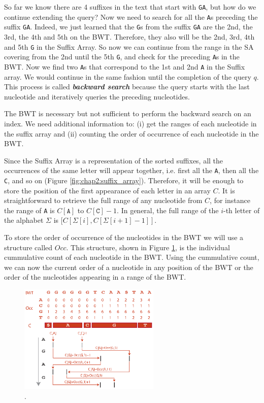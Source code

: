 So far we know there are 4 suffixes in the text that start with
\texttt{GA}, but how do we continue extending the query? Now we need
to search for all the \texttt{A}s preceding the suffix
\texttt{GA}. Indeed, we just learned that the \texttt{G}s from the
suffix \texttt{GA} are the 2nd, the 3rd, the 4th and 5th on the
BWT. Therefore, they also will be the 2nd, 3rd, 4th and 5th \texttt{G}
in the Suffix Array. So now we can continue from the range in the SA
covering from the 2nd until the 5th \texttt{G}, and check for the
preceding \texttt{A}s in the BWT. Now we find two \texttt{A}s that
correspond to the 1st and 2nd \texttt{A} in the Suffix array. We would
continue in the same fashion until the completion of the query
$q$. This process is called {\em\bf backward search} because the query
starts with the last nucleotide and iteratively queries the preceding
nucleotides.

The BWT is necessary but not sufficient to perform the backward search
on an index. We need additional information to: (i) get the ranges of
each nucleotide in the suffix array and (ii) counting the order of
occurrence of each nucleotide in the BWT.

Since the Suffix Array is a representation of the sorted suffixes, all
the occurrences of the same letter will appear together, i.e. first
all the \texttt{A}, then all the \texttt{C}, and so on (Figure
\ref{fig:chap2:suffix_array}). Therefore, it will be enough to store
the position of the first appearance of each letter in an array
$C$. It is straightforward to retrieve the full range of any
nucleotide from $C$, for instance the range of \texttt{A} is
$C[\texttt{A}]$ to $C[\texttt{C}]-1$. In general, the full range of
the $i$-th letter of the alphabet $\Sigma$ is $[C[\Sigma[i],
    C[\Sigma[i+1]-1]]$.  

To store the order of occurrence of the nucleotides in the BWT we will
use a structure called $Occ$. This structure, shown in Figure
\ref{fig:chap2:bs_occ_c}, is the individual cummulative count of each
nucleotide in the BWT. Using the cummulative count, we can now the 
current order of a nucleotide in any position of the BWT or the order
of the nucleotides appearing in a range of the BWT.

\begin{figure}[h]
	\begin{minipage}[b]{\linewidth}
	  \centering
	  \includegraphics*[width=0.6\textwidth]{figures/chap2_bs_occ_c}
	  \caption{.}
	  \label{fig:chap2:bs_occ_c}
   \end{minipage}
\end{figure}


